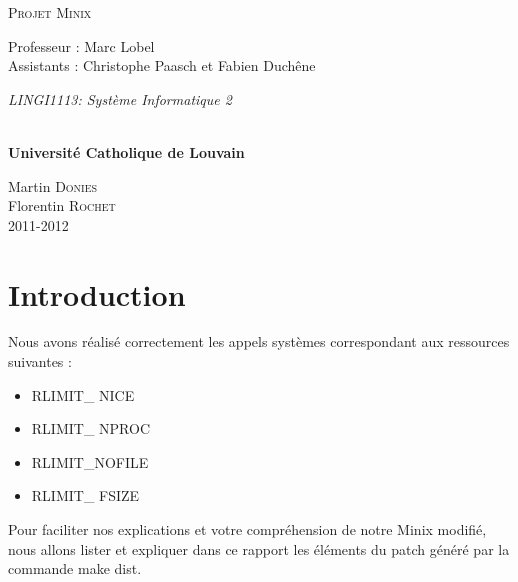 \documentclass[9pt , a4paper]{report}
\begin{document}
  
  	\begin{titlepage}
		\begin{center}
			{\huge \textsc{Projet Minix}}\\
			\vspace{0.4cm}
			
			{\Large {Professeur : Marc Lobel \\ \vspace{0.2cm} Assistants : Christophe Paasch et Fabien Duchêne }}\\
			\vspace{0.6cm}
			
			{\Large \textit{ LINGI1113: Système Informatique 2}}\\
			\vspace{1.2cm}

			\texttt{}\\
			\vspace{0.2cm}
			\vspace{0.1cm}
			{\Large \textbf{Universit\'e Catholique de Louvain}}
			\vspace{0.7cm}

			\vspace{0.2cm}

			Martin \textsc{Donies} \\
			Florentin \textsc{Rochet} \\
			\vspace{0.2cm}
			2011-2012\\
		\end{center}
	\end{titlepage}

	\newpage

	\tableofcontents
	\newpage
	\section{Introduction}
	
	Nous avons réalisé correctement les appels systèmes correspondant aux ressources suivantes : \\
	
	\begin{itemize}
		\item RLIMIT\_ NICE
		\item RLIMIT\_ NPROC
		\item RLIMIT\_NOFILE
		\item RLIMIT\_ FSIZE \\
	\end{itemize}
	
	Pour faciliter nos explications et votre compréhension de notre Minix modifié, nous allons lister et expliquer dans ce rapport  les éléments du patch généré par la commande make dist.
	
\end{document}
